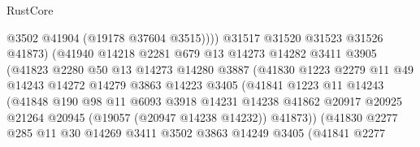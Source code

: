 \begin{lexlean}{RustCore}
\begin{coremodule}
                                  @3502
                                  @41904
                                  (@19178 @37604 @3515))))
                            @31517
                            @31520
                            @31523
                            @31526
                            @41873)
                          (@41940
                            @14218
                            @2281
                            @679
                            @13
                            @14273
                            @14282
                            @3411
                            @3905
                            (@41823
                              @2280
                              @50
                              @13
                              @14273
                              @14280
                              @3887
                              (@41830
                                @1223
                                @2279
                                @11
                                @49
                                @14243
                                @14272
                                @14279
                                @3863
                                @14223
                                @3405
                                (@41841
                                  @1223
                                  @11
                                  @14243
                                  (@41848
                                    @190
                                    @98
                                    @11
                                    @6093
                                    @3918
                                    @14231
                                    @14238
                                    @41862
                                    @20917
                                    @20925
                                    @21264
                                    @20945
                                    (@19057 (@20947 @14238 @14232))
                                    @41873))
                                (@41830
                                  @2277
                                  @285
                                  @11
                                  @30
                                  @14269
                                  @3411
                                  @3502
                                  @3863
                                  @14249
                                  @3405
                                  (@41841
                                    @2277

\end{coremodule}
\end{lexlean}
